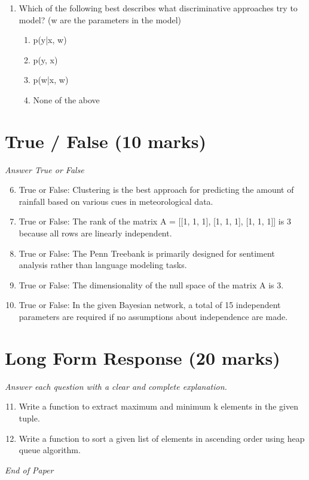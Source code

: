 \documentclass[12pt]{article}
\begin{document}
\begin{enumerate}[label=\arabic*.]
\begin{enumerate}[label=(\alph*)]
    \item P(X, Y, Z) = P(X) * P(Y|X) * P(Z|Y)
    \item P(X, Y, Z) = P(Z) * P(X|Z) * P(Y|Z)
    \item P(X, Y, Z) = P(X) * P(Y) * P(Z)
\end{enumerate}
\item Which of the following best describes what discriminative approaches try to model? (w are the parameters in the model)
\begin{enumerate}[label=(\alph*)]
    \item p(y|x, w)
    \item p(y, x)
    \item p(w|x, w)
    \item None of the above
\end{enumerate}
\end{enumerate}

\section*{True / False (10 marks)}
\textit{Answer True or False}
\begin{enumerate}[label=\arabic*.]
\setcounter{enumi}{5}
\item True or False: Clustering is the best approach for predicting the amount of rainfall based on various cues in meteorological data.
\item True or False: The rank of the matrix A = [[1, 1, 1], [1, 1, 1], [1, 1, 1]] is 3 because all rows are linearly independent.
\item True or False: The Penn Treebank is primarily designed for sentiment analysis rather than language modeling tasks.
\item True or False: The dimensionality of the null space of the matrix A is 3.
\item True or False: In the given Bayesian network, a total of 15 independent parameters are required if no assumptions about independence are made.
\end{enumerate}

\section*{Long Form Response (20 marks)}
\textit{Answer each question with a clear and complete explanation.}
\begin{enumerate}[label=\arabic*.]
\setcounter{enumi}{10}
\item Write a function to extract maximum and minimum k elements in the given tuple.
\item Write a function to sort a given list of elements in ascending order using heap queue algorithm.
\end{enumerate}

\vfill
\noindent\textit{End of Paper}
\end{document}
